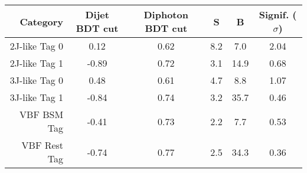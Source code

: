 \begin{tabular}{ r | c | c | c | c | c } 
\hline 
Category       & Dijet BDT cut & Diphoton BDT cut & S & B & Signif. ($\sigma$) \\ 
\hline 
2J-like  Tag 0 & 0.12         & 0.62             & 8.2    & 7.0        & 2.04         \\
2J-like  Tag 1 & -0.89        & 0.72             & 3.1    & 14.9       & 0.68         \\
3J-like  Tag 0 & 0.48         & 0.61             & 4.7    & 8.8        & 1.07         \\
3J-like  Tag 1 & -0.84        & 0.74             & 3.2    & 35.7       & 0.46         \\
VBF BSM  Tag   & -0.41        & 0.73             & 2.2    & 7.7        & 0.53         \\
VBF Rest Tag   & -0.74        & 0.77             & 2.5    & 34.3       & 0.36         \\
\hline 
\end{tabular}

